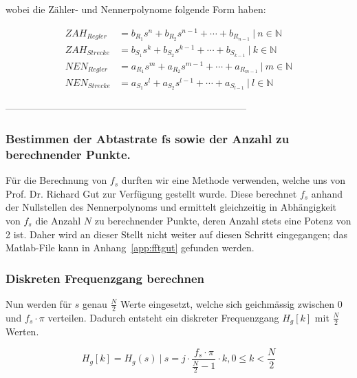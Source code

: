 wobei die Z\"ahler- und Nennerpolynome folgende Form haben:

\begin{align*}
    ZAH_{Regler}  & = b_{R_1} s^n  + b_{R_2} s^{n-1}  + \dotsb  + b_{R_{n-1}}     ~|~ n \in  \mathbb{N} \\
    ZAH_{Strecke} & = b_{S_1} s^k  + b_{S_2} s^{k-1}  + \dotsb  + b_{S_{k-1}}     ~|~ k \in  \mathbb{N}  \\
    NEN_{Regler}  & = a_{R_1} s^m  + a_{R_2} s^{m-1}  + \dotsb  + a_{R_{m-1}}     ~|~ m \in  \mathbb{N}  \\
    NEN_{Strecke} & = a_{S_1} s^l  + a_{S_2} s^{l-1}  + \dotsb  + a_{S_{l-1}}     ~|~ l \in  \mathbb{N}
\end{align*}


 --------------------------------------------------------------------------- %
\subsubsection*{Bestimmen der Abtastrate fs sowie der Anzahl zu berechnender Punkte.}
F\"ur die Berechnung von $f_s$ durften  wir eine Methode verwenden, welche uns
von  Prof. Dr. Richard Gut  zur  Verf\"ugung  gestellt wurde. Diese  berechnet
$f_s$ anhand der Nullstellen des  Nennerpolynoms und ermittelt gleichzeitig in
Abh\"angigkeit von $f_s$  die Anzahl $N$ zu berechnender  Punkte, deren Anzahl
stets eine  Potenz von  2 ist. Daher  wird an dieser  Stellt nicht  weiter auf
diesen Schritt  eingegangen; das  Matlab-File kann  in Anhang~\ref{app:fftgut}
gefunden werden.


\subsubsection*{Diskreten Frequenzgang berechnen}

Nun  werden  f\"ur  $s$  genau $\frac{N}{2}$  Werte  eingesetzt,  welche  sich
geichm\"assig zwischen 0  und $f_s \cdot \pi$  verteilen. Dadurch entsteht ein
diskreter Frequenzgang $H_g[k]$ mit $\frac{N}{2}$ Werten.

\begin{equation*}
    H_g[k] = H_g(s) ~|~ s=j \cdot \frac{f_s \cdot \pi}{\frac{N}{2} - 1} \cdot k, 0 \leq k < \frac{N}{2}
\end{equation*}


